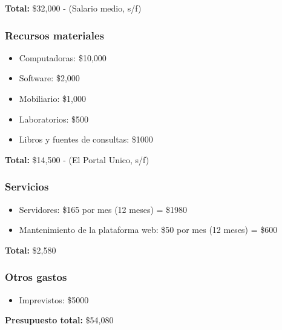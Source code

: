 \documentclass{article}
\begin{document}
\textbf{Total:} \$32,000
\cite{Talent} - (Salario medio, s/f)

\subsubsection{Recursos materiales}

\begin{itemize}
  \item Computadoras: \$10,000
  \item Software: \$2,000
  \item Mobiliario: \$1,000
  \item Laboratorios: \$500
  \item Libros y fuentes de consultas: \$1000
\end{itemize}

\textbf{Total:} \$14,500
\cite{Portal} - (El Portal Unico, s/f)

\subsubsection{Servicios}

\begin{itemize}
  \item Servidores: \$165 por mes (12 meses) = \$1980
  \item Mantenimiento de la plataforma web: \$50 por mes (12 meses) = \$600
\end{itemize}

\textbf{Total:} \$2,580

\subsubsection{Otros gastos}

\begin{itemize}
  \item Imprevistos: \$5000
\end{itemize}

\textbf{Presupuesto total:} \$54,080
\end{document}
